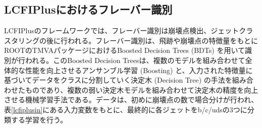 \subsection{LCFIPlusにおけるフレーバー識別}
LCFIPlusのフレームワークでは、フレーバー識別は崩壊点検出、ジェットクラスタリングの後に行われる。フレーバー識別は、飛跡や崩壊点の特徴量をもとにROOTのTMVAパッケージにおけるBoosted Decision Trees (BDTs) を用いて識別が行われる。このBoosted Decision Treesは、複数のモデルを組み合わせて全体的な性能を向上させるアンサンブル学習 (Boosting) と、入力された特徴量に基づいてデータをクラスに分割していく決定木 (Decision Tree) の手法を組み合わせたものであり、複数の弱い決定木モデルを組み合わせて決定木の精度を向上させる機械学習手法である。データは、初めに崩壊点の数で場合分けが行われ、表\ref{lcfiplusin}にある入力変数をもとに、最終的に各ジェットをb/c/udsの3つに分類する学習を行う。
